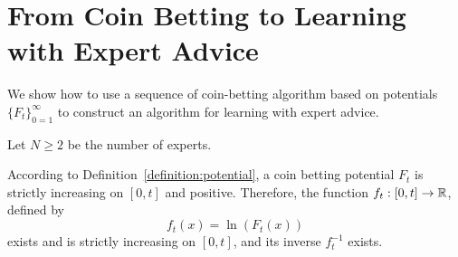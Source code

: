 \section{From Coin Betting to Learning with Expert Advice}
\label{section:reduction-experts}

We show how to use a sequence of coin-betting algorithm based on potentials
$\{F_t\}_{0=1}^\infty$ to construct an algorithm for learning with expert
advice.

Let $N \ge 2$ be the number of experts.

According to Definition~\ref{definition:potential}, a coin betting potential
$F_t$ is strictly increasing on $[0,t]$ and positive. Therefore,
the function $f_t:[0,t] \to \mathbb{R}$, defined by
$$
f_t(x) = \ln \left(F_t(x)\right)
$$
exists and is strictly increasing on $[0, t]$, and its inverse $f_t^{-1}$
exists.
